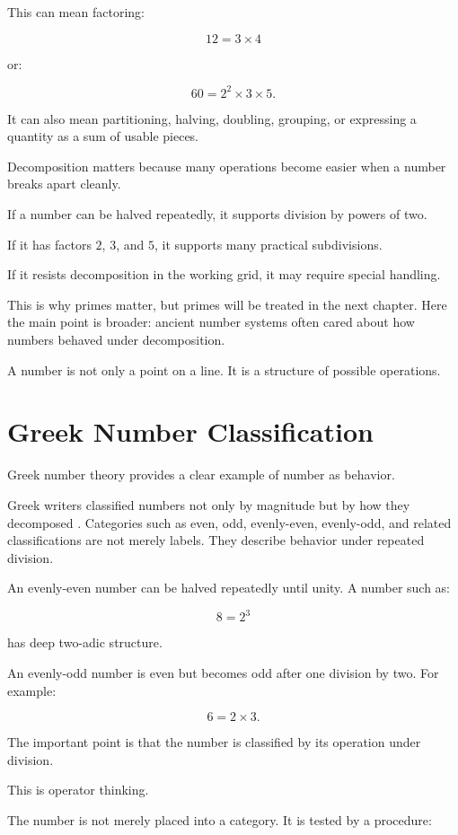 \documentclass[11pt]{book}
\begin{document}
This can mean factoring:

\[
12 = 3 \times 4
\]

or:

\[
60 = 2^2 \times 3 \times 5.
\]

It can also mean partitioning, halving, doubling, grouping, or expressing a quantity as a sum of usable pieces.

Decomposition matters because many operations become easier when a number breaks apart cleanly.

If a number can be halved repeatedly, it supports division by powers of two.

If it has factors \(2\), \(3\), and \(5\), it supports many practical subdivisions.

If it resists decomposition in the working grid, it may require special handling.

This is why primes matter, but primes will be treated in the next chapter. Here the main point is broader: ancient number systems often cared about how numbers behaved under decomposition.

A number is not only a point on a line. It is a structure of possible operations.

\section{Greek Number Classification}

Greek number theory provides a clear example of number as behavior.

Greek writers classified numbers not only by magnitude but by how they decomposed \cite{EuclidHeath1956Elements,Heath1921GreekMathematics}. Categories such as even, odd, evenly-even, evenly-odd, and related classifications are not merely labels. They describe behavior under repeated division.

An evenly-even number can be halved repeatedly until unity. A number such as:

\[
8 = 2^3
\]

has deep two-adic structure.

An evenly-odd number is even but becomes odd after one division by two. For example:

\[
6 = 2 \times 3.
\]

The important point is that the number is classified by its operation under division.

This is operator thinking.

The number is not merely placed into a category. It is tested by a procedure:
\end{document}
